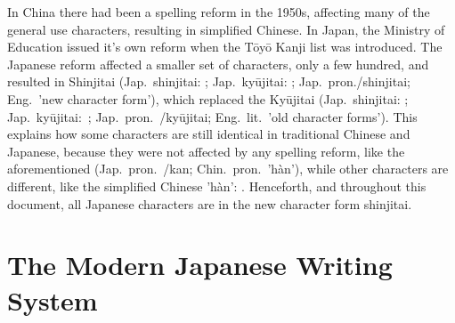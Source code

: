 In China there had been a spelling reform in the 1950s, affecting many of the
general use characters, resulting in simplified Chinese. In Japan, the Ministry
of Education issued it's own reform when the Tōyō Kanji list was introduced.
The Japanese reform affected a smaller set of characters, only a few 
hundred, and resulted in Shinjitai (Jap.\ shinjitai: ; 
Jap.\ kyūjitai: ;
Jap.\ pron.\　/shinjitai; Eng.\ 'new character form'), 
which replaced the Kyūjitai 
(Jap.\ shinjitai: ; Jap.\ kyūjitai:\ ; 
Jap.\ pron.\ /kyūjitai; Eng.\ lit.\ 'old character forms'). 
This explains how some characters are still identical in traditional Chinese and 
Japanese, because they were not affected by any spelling reform, like the 
aforementioned  (Jap.\ pron.\ /kan; Chin.\ pron.\ 'hàn'),
while other characters are different, like the simplified 
Chinese 'hàn': . Henceforth, and throughout this document, all Japanese characters are in the new character form shinjitai.

\section{The Modern Japanese Writing System}
\label{sec:modernjapanesewritingsystem}


